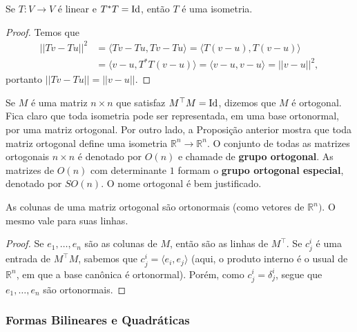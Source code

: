 \begin{proposition}
    Se $T \colon V \to V$ é linear e $T^*T = \operatorname{Id}$, então $T$ é uma isometria.
\end{proposition}
\begin{proof}
    Temos que \begin{align}
        ||Tv - Tu||^2 &= \langle Tv - Tu, Tv - Tu \rangle = \langle T(v-u), T(v-u) \rangle \\ &= \langle v-u, T^*T(v - u) \rangle = \langle v - u, v - u \rangle = ||v - u||^2,
    \end{align} portanto $||Tv - Tu|| = ||v - u||$.
\end{proof}

Se $M$ é uma matriz $n \times n$ que satisfaz $M^\top M = \operatorname{Id}$, dizemos que $M$ é ortogonal. Fica claro que toda isometria pode ser representada, em uma base ortonormal, por uma matriz ortogonal. Por outro lado, a Proposição anterior mostra que toda matriz ortogonal define uma isometria $\mathbb{R}^n \to \mathbb{R}^n$. O conjunto de todas as matrizes ortogonais $n \times n$ é denotado por $O(n)$ e chamade de \textbf{grupo ortogonal}. As matrizes de $O(n)$ com determinante $1$ formam o \textbf{grupo ortogonal especial}, denotado por $SO(n)$. O nome ortogonal é bem justificado.

\begin{proposition}
    As colunas de uma matriz ortogonal são ortonormais (como vetores de $\mathbb{R}^n)$. O mesmo vale para suas linhas.
\end{proposition}
\begin{proof}
    Se $e_1, \dots, e_n$ são as colunas de $M$, então são as linhas de $M^\top$. Se $c^i_j$ é uma entrada de $M^\top M$, sabemos que $c^i_j = \langle e_i, e_j \rangle$ (aqui, o produto interno é o usual de $\mathbb{R}^n$, em que a base canônica é ortonormal). Porém, como $c^i_j = \delta^i_j$, segue que $e_1, \dots, e_n$ são ortonormais.
\end{proof}

\subsubsection*{Formas Bilineares e Quadráticas}

